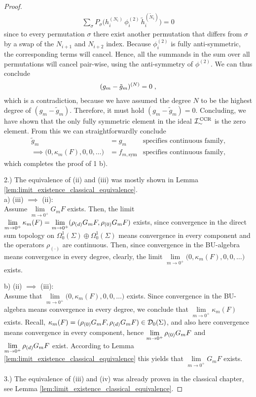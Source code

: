 \begin{proof}
	\begin{align}
\sum\limits_\sigma P_\sigma \big(  h_i^{(N_i)}\, \phi_i^{(2)}\, \tilde{h}_i^{(\tilde{N}_i)} \big) = 0
	\end{align}
	since to every permutation $\sigma$ there exist another permutation that differs from $\sigma$ by a swap of the $N_{i+1}$ and $N_{i+2}$ index. Because $\phi^{(2)}_i$ is fully anti-symmetric, the corresponding terms will cancel. Hence, all the summands in the sum over all permutations will cancel pair-wise, using the anti-symmetry of $\phi^{(2)}$. We can thus conclude
	\begin{align}
(g_m - \tilde{g}_m)^{(N)} = 0 \;,
	\end{align}
	which is a contradiction, because we have assumed the degree $N$ to be the highest degree of $(g_m - \tilde{g}_m)$. Therefore, it must hold $(g_m - \tilde{g}_m) = 0$. Concluding, we have shown that the only fully symmetric element in the ideal ${\mathcal{I}}_{\sim}^\text{\,CCR}$ is the zero element. From this we can straightforwardly conclude
	\begin{align}
		\tilde{g}_m &= g_m &\text{specifies continuous family,} \\
		\implies  \big( 0, \kappa_m(F),0,0,\dots\big) &= f_{m,\text{sym}} &\text{specifies continuous family,}
	\end{align}
	which completes the proof of 1 b).\par
	2.) The equivalence of (ii) and (iii) was mostly shown in Lemma \ref{lem:limit_existence_classical_equivalence}.\\
	a) (iii) $\implies$ (ii):\\
	Assume $\lim\limits_{m \to 0^+} G_m F $ exists. Then, the limit $\lim\limits_{m \to 0^+} \kappa_m(F) = \lim\limits_{m \to 0^+} (\rho_{(d)} G_m F, \rho_{(0)} G_m F)$ exists, since convergence in the direct sum topology on $\Omega^1_0(\Sigma) \oplus \Omega^1_0(\Sigma)$ means convergence in every component and the operators $\rho_{(\cdot)}$ are continuous. Then, since convergence in the BU-algebra means convergence in every degree, clearly, the limit $\lim\limits_{m \to 0^+} \big( 0 , \kappa_m(F),0,0,\dots \big)$ exists.\par
	b) (ii) $\implies$ (iii):\\ Assume that $\lim\limits_{m \to 0^+} \big( 0 , \kappa_m(F),0,0,\dots \big)$ exists.
	Since convergence in the BU-algebra means convergence in every degree, we conclude that $\lim\limits_{m \to 0^+} \kappa_m(F)$ exists. Recall, $\kappa_m(F) = (\rho_{(0)} G_m F , \rho_{(d)} G_m F) \in \mathcal{D}_{0}(\Sigma)$, and also here convergence means convergence in every component, hence $\lim\limits_{m \to 0^+}  \rho_{(0)} G_m F $ and $\lim\limits_{m \to 0^+}  \rho_{(d)} G_m F$ exist. According to Lemma \ref{lem:limit_existence_classical_equivalence} this yields that $\lim\limits_{m \to 0^+} G_m F $ exists.\par
%
	3.) The equivalence of (iii) and (iv) was already proven in the classical chapter, see Lemma \ref{lem:limit_existence_classical_equivalence}.
	\end{proof}

